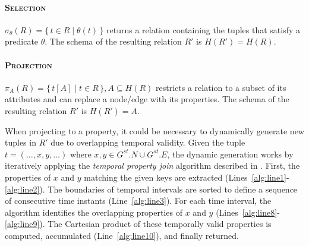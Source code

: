 
\paragraph{\textbf{\textsc{Selection}}} $\sigma_{\theta}(R) = \{\, t \in R \mid \theta(t) \,\}$ returns a relation containing the tuples that satisfy a predicate $\theta$.
The schema of the resulting relation $R'$ is $H(R') = H(R)$.

\paragraph{\textbf{\textsc{Projection}}} $\pi_{A}(R) = \{\, t[A] \mid t \in R \,\}, A\subseteq H(R)$ restricts a relation to a subset of its 
attributes and can replace a node/edge with its properties.
The schema of the resulting relation $R'$ is $H(R') = A$.

When projecting to a property, it could be necessary to dynamically generate new tuples in $R'$ due to overlapping temporal validity.
Given the tuple $t=(\dots,x,y,\dots)$ where $x,y \in G^{st}.N \cup G^{st}.E$, the dynamic generation works by iteratively applying the \textit{temporal property join} algorithm described in .
First, the properties of $x$ and $y$ matching the given keys are extracted (Lines~\ref{alg:line1}-\ref{alg:line2}).
The boundaries of temporal intervals are sorted to define a sequence of consecutive time instants (Line~\ref{alg:line3}).
For each time interval, the algorithm identifies the overlapping properties of $x$ and $y$ (Lines~\ref{alg:line8}-\ref{alg:line9}).
The Cartesian product of these temporally valid properties is computed, accumulated (Line~\ref{alg:line10}), and finally returned.

